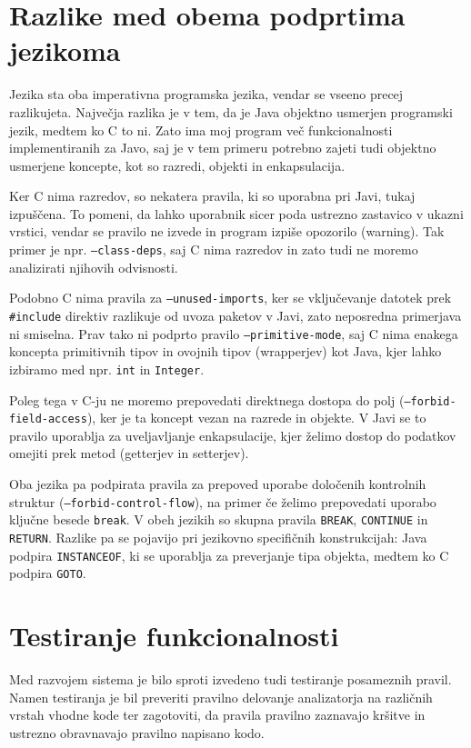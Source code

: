 \documentclass[a4paper,12pt,openright]{book}
\begin{document}
\section{Razlike med obema podprtima jezikoma}

Jezika sta oba imperativna programska jezika, vendar se vseeno precej razlikujeta. Največja razlika je v tem, da je Java objektno usmerjen programski jezik, medtem ko C to ni. Zato ima moj program več funkcionalnosti implementiranih za Javo, saj je v tem primeru potrebno zajeti tudi objektno usmerjene koncepte, kot so razredi, objekti in enkapsulacija.

Ker C nima razredov, so nekatera pravila, ki so uporabna pri Javi, tukaj izpuščena. To pomeni, da lahko uporabnik sicer poda ustrezno zastavico v ukazni vrstici, vendar se pravilo ne izvede in program izpiše opozorilo (warning). Tak primer je npr. \texttt{--class-deps}, saj C nima razredov in zato tudi ne moremo analizirati njihovih odvisnosti.

Podobno C nima pravila za \texttt{--unused-imports}, ker se vključevanje datotek prek \texttt{#include} direktiv razlikuje od uvoza paketov v Javi, zato neposredna primerjava ni smiselna. Prav tako ni podprto pravilo \texttt{--primitive-mode}, saj C nima enakega koncepta primitivnih tipov in ovojnih tipov (wrapperjev) kot Java, kjer lahko izbiramo med npr. \texttt{int} in \texttt{Integer}.

Poleg tega v C-ju ne moremo prepovedati direktnega dostopa do polj (\texttt{--forbid-field-access}), ker je ta koncept vezan na razrede in objekte. V Javi se to pravilo uporablja za uveljavljanje enkapsulacije, kjer želimo dostop do podatkov omejiti prek metod (getterjev in setterjev).

Oba jezika pa podpirata pravila za prepoved uporabe določenih kontrolnih struktur (\texttt{--forbid-control-flow}), na primer če želimo prepovedati uporabo ključne besede \texttt{break}. V obeh jezikih so skupna pravila \texttt{BREAK}, \texttt{CONTINUE} in \texttt{RETURN}. Razlike pa se pojavijo pri jezikovno specifičnih konstrukcijah: Java podpira \texttt{INSTANCEOF}, ki se uporablja za preverjanje tipa objekta, medtem ko C podpira \texttt{GOTO}.

\section{Testiranje funkcionalnosti}

Med razvojem sistema je bilo sproti izvedeno tudi testiranje posameznih pravil. Namen testiranja je bil preveriti pravilno delovanje analizatorja na različnih vrstah vhodne kode ter zagotoviti, da pravila pravilno zaznavajo kršitve in ustrezno obravnavajo pravilno napisano kodo.
\end{document}
